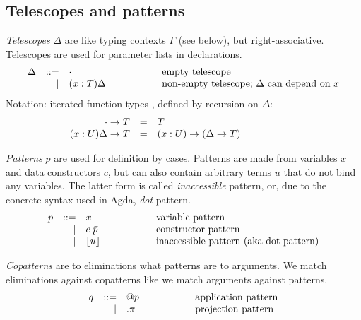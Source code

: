 \documentclass[acmlarge,fleqn]{acmart}\settopmatter{}
\begin{document}
\subsection{Telescopes and patterns}

\emph{Telescopes} $\Delta$ are like typing contexts $\Gamma$ (see below), but right-associative.
Telescopes are used \eg{} for parameter lists in declarations.
\[
\begin{array}{lrl@{\hspace{2cm}}l}
\Delta &::=& \cempty       & \text{empty telescope} \\
       &  |& (x : T)\Delta & \text{non-empty telescope; $\Delta$ can depend on $x$} \\
\end{array}
\]
Notation: iterated function types , defined by recursion on $\Delta$:
\[
\begin{array}{rrl@{\hspace{2cm}}l}
\cempty \to T       &=& T &\\
(x : U)\Delta \to T &=& (x : U) \to (\Delta \to T) & \\
\end{array}
\]

\emph{Patterns} $p$ are used for definition by cases.
Patterns are made from variables $x$ and data constructors $c$,
but can also contain arbitrary terms $u$ that do not bind any variables.
The latter form is called \emph{inaccessible} pattern, or, due to the
concrete syntax used in Agda, \emph{dot} pattern.
\[
\begin{array}{lrl@{\hspace{2cm}}l}
p &::=& x              &   \text{variable pattern} \\
  & | & c\; \bar{p}    &   \text{constructor pattern} \\
  & | & \dotp u        &   \text{inaccessible pattern (aka dot pattern)} \\
\end{array}
\]

\emph{Copatterns} are to eliminations what patterns are to arguments.
We match eliminations against copatterns like we match arguments against patterns.
\[
\begin{array}{lrl@{\hspace{2cm}}l}
q &::= & @p   & \text{application pattern} \\
  &  | & .\pi & \text{projection  pattern}\\
\end{array}
\]
\end{document}
